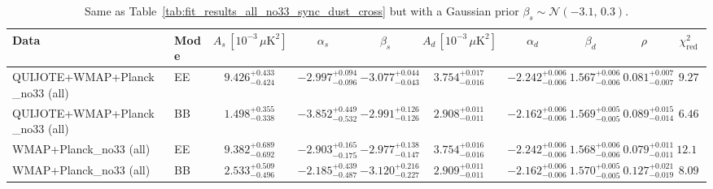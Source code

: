 \begin{table}[h]
\centering
\scriptsize
\setlength{\tabcolsep}{4pt}
\caption{Same as Table~\ref{tab:fit_results_all_no33_sync_dust_cross} but with a Gaussian prior $\beta_s \sim \mathcal{N}(-3.1,\,0.3)$.}
\label{tab:fit_results_all_no33_sync_dust_cross_prior_betas}
\begin{tabular}{llcccccccc}
\toprule
Data & Mode & $A_s\,[10^{-3}\,\mu\mathrm{K}^2]$ & $\alpha_s$ & $\beta_s$ & $A_d\,[10^{-3}\,\mu\mathrm{K}^2]$ & $\alpha_d$ & $\beta_d$ & $\rho$ & $\chi^2_\mathrm{red}$ \\
\midrule
QUIJOTE+WMAP+Planck\_no33 (all) & EE & $9.426^{+0.433}_{-0.424}$ & $-2.997^{+0.094}_{-0.096}$ & $-3.077^{+0.044}_{-0.043}$ & $3.754^{+0.017}_{-0.016}$ & $-2.242^{+0.006}_{-0.006}$ & $1.567^{+0.006}_{-0.006}$ & $0.081^{+0.007}_{-0.007}$ & $9.27$ \\
QUIJOTE+WMAP+Planck\_no33 (all) & BB & $1.498^{+0.355}_{-0.338}$ & $-3.852^{+0.449}_{-0.532}$ & $-2.991^{+0.126}_{-0.126}$ & $2.908^{+0.011}_{-0.011}$ & $-2.162^{+0.006}_{-0.006}$ & $1.569^{+0.005}_{-0.005}$ & $0.089^{+0.015}_{-0.014}$ & $6.46$ \\
WMAP+Planck\_no33 (all) & EE & $9.382^{+0.689}_{-0.692}$ & $-2.903^{+0.165}_{-0.175}$ & $-2.977^{+0.138}_{-0.147}$ & $3.754^{+0.016}_{-0.016}$ & $-2.242^{+0.006}_{-0.006}$ & $1.568^{+0.006}_{-0.006}$ & $0.079^{+0.011}_{-0.011}$ & $12.12$ \\
WMAP+Planck\_no33 (all) & BB & $2.533^{+0.509}_{-0.496}$ & $-2.185^{+0.439}_{-0.487}$ & $-3.120^{+0.216}_{-0.227}$ & $2.909^{+0.011}_{-0.011}$ & $-2.162^{+0.006}_{-0.006}$ & $1.570^{+0.005}_{-0.005}$ & $0.127^{+0.021}_{-0.019}$ & $8.09$ \\
\bottomrule
\end{tabular}
\end{table}
